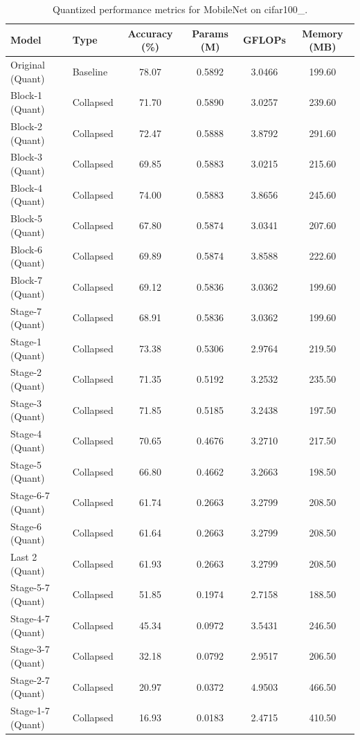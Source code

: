 \begin{table}
\caption{Quantized performance metrics for MobileNet on cifar100_.}
\label{tab:MobileNet_cifar100__quant}
\begin{tabular}{llcccc}
\toprule
Model & Type & Accuracy (\%) & Params (M) & GFLOPs & Memory (MB) \\
\midrule
Original
(Quant) & Baseline & 78.07 & 0.5892 & 3.0466 & 199.60 \\
Block-1
(Quant) & Collapsed & 71.70 & 0.5890 & 3.0257 & 239.60 \\
Block-2
(Quant) & Collapsed & 72.47 & 0.5888 & 3.8792 & 291.60 \\
Block-3
(Quant) & Collapsed & 69.85 & 0.5883 & 3.0215 & 215.60 \\
Block-4
(Quant) & Collapsed & 74.00 & 0.5883 & 3.8656 & 245.60 \\
Block-5
(Quant) & Collapsed & 67.80 & 0.5874 & 3.0341 & 207.60 \\
Block-6
(Quant) & Collapsed & 69.89 & 0.5874 & 3.8588 & 222.60 \\
Block-7
(Quant) & Collapsed & 69.12 & 0.5836 & 3.0362 & 199.60 \\
Stage-7
(Quant) & Collapsed & 68.91 & 0.5836 & 3.0362 & 199.60 \\
Stage-1
(Quant) & Collapsed & 73.38 & 0.5306 & 2.9764 & 219.50 \\
Stage-2
(Quant) & Collapsed & 71.35 & 0.5192 & 3.2532 & 235.50 \\
Stage-3
(Quant) & Collapsed & 71.85 & 0.5185 & 3.2438 & 197.50 \\
Stage-4
(Quant) & Collapsed & 70.65 & 0.4676 & 3.2710 & 217.50 \\
Stage-5
(Quant) & Collapsed & 66.80 & 0.4662 & 3.2663 & 198.50 \\
Stage-6-7
(Quant) & Collapsed & 61.74 & 0.2663 & 3.2799 & 208.50 \\
Stage-6
(Quant) & Collapsed & 61.64 & 0.2663 & 3.2799 & 208.50 \\
Last 2
(Quant) & Collapsed & 61.93 & 0.2663 & 3.2799 & 208.50 \\
Stage-5-7
(Quant) & Collapsed & 51.85 & 0.1974 & 2.7158 & 188.50 \\
Stage-4-7
(Quant) & Collapsed & 45.34 & 0.0972 & 3.5431 & 246.50 \\
Stage-3-7
(Quant) & Collapsed & 32.18 & 0.0792 & 2.9517 & 206.50 \\
Stage-2-7
(Quant) & Collapsed & 20.97 & 0.0372 & 4.9503 & 466.50 \\
Stage-1-7
(Quant) & Collapsed & 16.93 & 0.0183 & 2.4715 & 410.50 \\
\bottomrule
\end{tabular}
\end{table}
